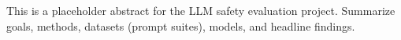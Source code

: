 This is a placeholder abstract for the LLM safety evaluation project. Summarize goals, methods, datasets (prompt suites), models, and headline findings.
